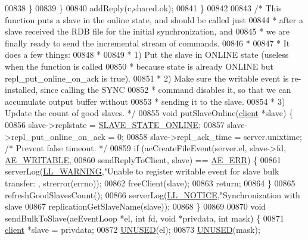 \begin{DoxyCode}
{{{{{{{{{{{{{{{{{{{{{{{{{{{{{{{{00838         \}
00839     \}
00840     addReply(c,shared.ok);
00841 \}
00842 
00843 \textcolor{comment}{/* This function puts a slave in the online state, and should be called just}
00844 \textcolor{comment}{ * after a slave received the RDB file for the initial synchronization, and}
00845 \textcolor{comment}{ * we are finally ready to send the incremental stream of commands.}
00846 \textcolor{comment}{ *}
00847 \textcolor{comment}{ * It does a few things:}
00848 \textcolor{comment}{ *}
00849 \textcolor{comment}{ * 1) Put the slave in ONLINE state (useless when the function is called}
00850 \textcolor{comment}{ *    because state is already ONLINE but repl\_put\_online\_on\_ack is true).}
00851 \textcolor{comment}{ * 2) Make sure the writable event is re-installed, since calling the SYNC}
00852 \textcolor{comment}{ *    command disables it, so that we can accumulate output buffer without}
00853 \textcolor{comment}{ *    sending it to the slave.}
00854 \textcolor{comment}{ * 3) Update the count of good slaves. */}
00855 \textcolor{keywordtype}{void} putSlaveOnline(\hyperlink{structclient}{client} *slave) \{
00856     slave->replstate = \hyperlink{server_8h_ad895fdf16e5ed5275d19ddf8578b900f}{SLAVE\_STATE\_ONLINE};
00857     slave->repl\_put\_online\_on\_ack = 0;
00858     slave->repl\_ack\_time = server.unixtime; \textcolor{comment}{/* Prevent false timeout. */}
00859     \textcolor{keywordflow}{if} (aeCreateFileEvent(server.el, slave->fd, \hyperlink{ae_8h_ab6bfb0366ccb6277112d132c2a2bf500}{AE\_WRITABLE},
00860         sendReplyToClient, slave) == \hyperlink{ae_8h_aa16dcf7effdf8f8df97f51b1cb51a9df}{AE\_ERR}) \{
00861         serverLog(\hyperlink{server_8h_a31229b9334bba7d6be2a72970967a14b}{LL\_WARNING},\textcolor{stringliteral}{"Unable to register writable event for slave bulk transfer: %
      , strerror(errno));
00862         freeClient(slave);
00863         \textcolor{keywordflow}{return};
00864     \}
00865     refreshGoodSlavesCount();
00866     serverLog(\hyperlink{server_8h_a8c54c191e436c7dd3012167212692401}{LL\_NOTICE},\textcolor{stringliteral}{"Synchronization with slave %
00867         replicationGetSlaveName(slave));
00868 \}
00869 
00870 \textcolor{keywordtype}{void} sendBulkToSlave(aeEventLoop *el, \textcolor{keywordtype}{int} fd, \textcolor{keywordtype}{void} *privdata, \textcolor{keywordtype}{int} mask) \{
00871     \hyperlink{structclient}{client} *slave = privdata;
00872     \hyperlink{server_8h_ae7c9dc8f13568a9c856573751f1ee1ec}{UNUSED}(el);
00873     \hyperlink{server_8h_ae7c9dc8f13568a9c856573751f1ee1ec}{UNUSED}(mask);
}}}}}}}}}}}}}}}}}}}}}}}}}}}}}}}}}}
\end{DoxyCode}
